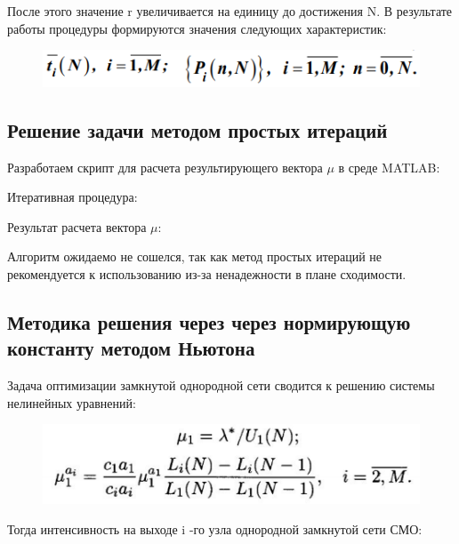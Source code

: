 \documentclass[14pt,a4paper,report]{report}
\begin{document}
После этого значение r увеличивается на единицу до достижения N. В результате работы процедуры формируются значения следующих характеристик:

\begin{figure}[h!]
	\centering
	\includegraphics[scale = 0.69]{images/4_4.png}
	\label{image:44}
\end{figure}

\subsection{Решение задачи методом простых итераций}

Разработаем скрипт для расчета результирующего вектора $\mu$ в среде MATLAB:



Итеративная процедура:



Результат расчета вектора $\mu$:



Алгоритм ожидаемо не сошелся, так как метод простых итераций не рекомендуется к использованию из-за ненадежности в плане сходимости.

\clearpage

\subsection{Методика решения через через нормирующую константу методом Ньютона}

Задача оптимизации замкнутой однородной сети сводится к решению системы нелинейных уравнений:

\begin{figure}[h!]
	\centering
	\includegraphics[scale = 0.79]{images/4_r.png}
	\label{image:4rx}
\end{figure}

Тогда интенсивность на выходе i -го узла однородной замкнутой сети СМО:
\end{document}
